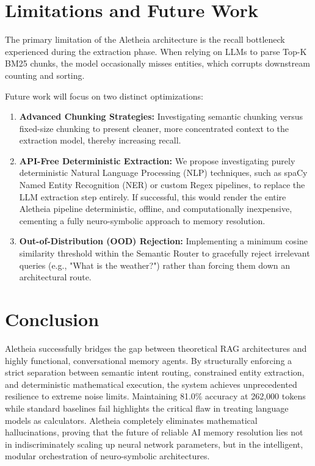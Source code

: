 \documentclass[journal,10pt]{IEEEtran}
\begin{document}
\section{Limitations and Future Work}
The primary limitation of the Aletheia architecture is the recall bottleneck experienced during the extraction phase. When relying on LLMs to parse Top-K BM25 chunks, the model occasionally misses entities, which corrupts downstream counting and sorting. 

Future work will focus on two distinct optimizations:
\begin{enumerate}
    \item \textbf{Advanced Chunking Strategies:} Investigating semantic chunking versus fixed-size chunking to present cleaner, more concentrated context to the extraction model, thereby increasing recall.
    \item \textbf{API-Free Deterministic Extraction:} We propose investigating purely deterministic Natural Language Processing (NLP) techniques, such as spaCy Named Entity Recognition (NER) or custom Regex pipelines, to replace the LLM extraction step entirely. If successful, this would render the entire Aletheia pipeline deterministic, offline, and computationally inexpensive, cementing a fully neuro-symbolic approach to memory resolution.
    \item \textbf{Out-of-Distribution (OOD) Rejection:} Implementing a minimum cosine similarity threshold within the Semantic Router to gracefully reject irrelevant queries (e.g., "What is the weather?") rather than forcing them down an architectural route.
\end{enumerate}

\section{Conclusion}
Aletheia successfully bridges the gap between theoretical RAG architectures and highly functional, conversational memory agents. By structurally enforcing a strict separation between semantic intent routing, constrained entity extraction, and deterministic mathematical execution, the system achieves unprecedented resilience to extreme noise limits. Maintaining 81.0\% accuracy at 262,000 tokens while standard baselines fail highlights the critical flaw in treating language models as calculators. Aletheia completely eliminates mathematical hallucinations, proving that the future of reliable AI memory resolution lies not in indiscriminately scaling up neural network parameters, but in the intelligent, modular orchestration of neuro-symbolic architectures.
\end{document}
